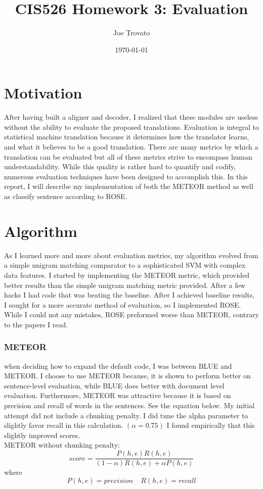 \documentclass{article}
\begin{document}
\title{CIS526 Homework 3: Evaluation}
\author{Joe Trovato}
\date{\today}
\maketitle
\setlength{\parindent}{10ex}

\section{Motivation}
\par
After having built a aligner and decoder, I realized that these modules are useless without the ability to evaluate the proposed translations. Evaluation is integral to statistical machine translation because it determines how the translator learns, and what it believes to be a good translation. There are many metrics by which a translation can be evaluated but all of these metrics strive to encompass human understandability. While this quality is rather hard to quantify and codify, numerous evaluation techniques have been designed to accomplish this. In this report, I will describe my implementation of both the METEOR method as well as classify sentence according to ROSE. 

\section{Algorithm}
As I learned more and more about evaluation metrics, my algorithm evolved from a simple unigram matching comparator to a sophisticated SVM with complex data features. I started by implementing the METEOR metric, which provided better results than the simple unigram matching metric provided. After a few hacks I had code that was beating the baseline. After I achieved baseline results, I sought for a more accurate method of evaluation, so I implemented ROSE. While I could not any mistakes, ROSE preformed worse than METEOR, contrary to the papers I read. 

\subsubsection{METEOR}
\par
when deciding how to expand the default code, I was between BLUE and METEOR. I choose to use METEOR because, it is shown to perform better on sentence-level evaluation, while BLUE does better with document level evaluation. Furthermore, METEOR was attractive because it is based on precision and recall of words in the sentences. See the equation below. My initial attempt did not include a chunking penalty. I did tune the alpha parameter to slightly favor recall in this calculation. $(\alpha = 0.75)$ I found empirically that this slightly improved scores.
\\
METEOR without chunking penalty:
$$score = \frac{P(h,e)R(h,e)}{(1-\alpha)R(h,e) + \alpha P(h,e)} $$
where $$ P(h,e) = precision \ \ \ \ \  R(h,e) = recall$$
\\
\end{document}
